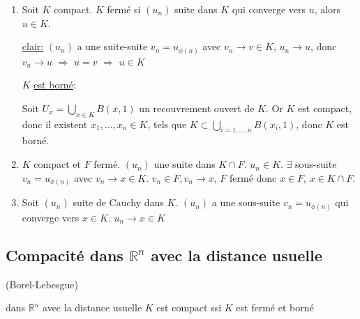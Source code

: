 \documentclass[a4paper]{report}
\newcommand\R{\ensuremath{\mathbb{R}}}
\let\implies\Rightarrow
\theoremstyle{definition}
\begin{document}
\begin{preuve}
   \begin{enumerate}
       \item Soit $K$ compact.  $K$ fermé si  $(u_n)$ suite dans  $K$ qui converge vers  $u$, alors  $u \in K$.
           \par
           \underline{clair:}  $(u_n)$ a une suite-suite  $v_n = u_{\phi(n)}$ avec $v_n \to v \in K$, $u_n \to u$, donc $v_n \to u$ $\implies$ $u = v$  $\implies$ $u \in K$
           \par
           $K$ \underline{est borné}:
           \par
              Soit $U_x = \bigcup_{x \in K} B(x, 1)$ un recouvrement ouvert de $K$. Or  $K$ est compact, donc il existent  $x_1, \ldots, x_n \in K$, tels que $K \subset \bigcup_{i = 1, \ldots, n} B(x_i, 1) $, donc $K$ est borné.
        \item $K$ compact et $F$ fermé. $(u_n)$ une suite dans $K \cap F$. $u_n \in K$. $ \exists$ sous-suite $v_n = u_{\phi(n)}$ avec $v_n \to x \in K$. $v_n \in F, v_n \to x$, $F$ fermé donc $x \in F$, $x \in K \cap F$.
        \item Soit $(u_n)$ suite de Cauchy dans $K$. $(u_n)$ a une sous-suite $v_n = u_ { \phi(n)}$ qui converge vers $x \in K$. $u_n \to x \in K$
   \end{enumerate} 
\end{preuve}

\subsection{Compacité dans $\R^n$ avec la distance usuelle}
\begin{theorem}
    (Borel-Lebesgue)
    \par
    dans $\R^n$ avec la distance usuelle $K$ est compact ssi  $K$ est fermé et borné
\end{theorem}
\end{document}
